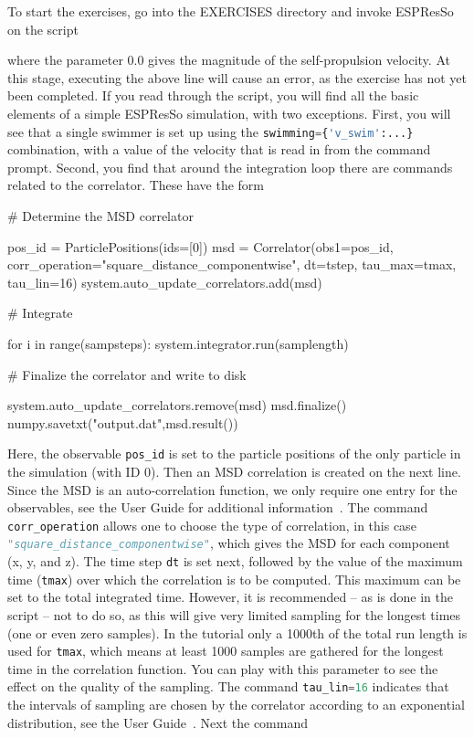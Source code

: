 \documentclass[aip,jcp,reprint,a4paper,onecolumn,amsmath]{revtex4-1}
\newcommand{\es}{\mbox{\textsf{ESPResSo}}\xspace}
\newcommand\codees{\lstinline[language=python]}
\begin{document}
To start the exercises, go into the EXERCISES directory and invoke \es{} on the script
where the parameter 0.0 gives the magnitude of the self-propulsion velocity. At this stage, executing the above line will cause an error, as the exercise has not yet been completed. If you read through the script, you will find all the basic elements of a simple \es{} simulation, with two exceptions. First, you will see that a single swimmer is set up using the \codees|swimming={'v_swim':...}| combination, with a value of the velocity that is read in from the command prompt. Second, you find that around the integration loop there are commands related to the correlator. These have the form
\begin{espresso}
# Determine the MSD correlator

pos_id = ParticlePositions(ids=[0])
msd = Correlator(obs1=pos_id,
                   corr_operation="square_distance_componentwise",
                   dt=tstep,
                   tau_max=tmax,
                   tau_lin=16)
system.auto_update_correlators.add(msd)

# Integrate

for i in range(sampsteps):
    system.integrator.run(samplength)

# Finalize the correlator and write to disk

system.auto_update_correlators.remove(msd)
msd.finalize()
numpy.savetxt("output.dat",msd.result())
\end{espresso}
Here, the observable \codees{pos_id} is set to the particle positions of the only particle in the simulation (with ID 0). Then an MSD correlation is created on the next line. Since the MSD is an auto-correlation function, we only require one entry for the observables, see the User Guide for additional information~\cite{UG}. The command \codees{corr_operation} allows one to choose the type of correlation, in this case \codees{"square_distance_componentwise"}, which gives the MSD for each component (x, y, and z). The time step \codees{dt} is set next, followed by the value of the maximum time (\codees{tmax}) over which the correlation is to be computed. This maximum can be set to the total integrated time. However, it is recommended -- as is done in the script -- not to do so, as this will give very limited sampling for the longest times (one or even zero samples). In the tutorial only a 1000th of the total run length is used for \codees{tmax}, which means at least 1000 samples are gathered for the longest time in the correlation function. You can play with this parameter to see the effect on the quality of the sampling. The command \codees{tau_lin=16} indicates that the intervals of sampling are chosen by the correlator according to an exponential distribution, see the User Guide~\cite{UG}. Next the command
\end{document}
